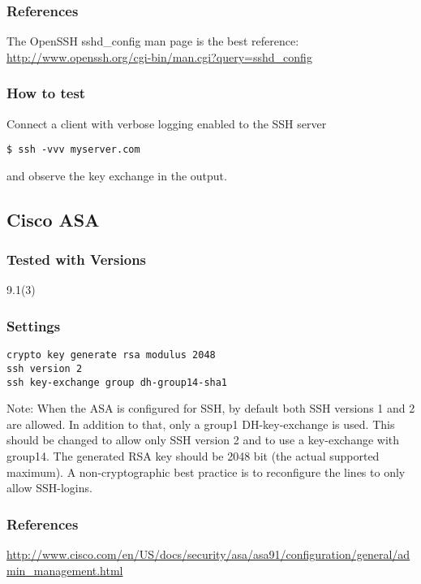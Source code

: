 \subsubsection{References}
The OpenSSH sshd\_config  man page is the best reference: \url{http://www.openssh.org/cgi-bin/man.cgi?query=sshd_config}

\subsubsection{How to test}
Connect a client with verbose logging enabled to the SSH server
\begin{lstlisting}
$ ssh -vvv myserver.com
\end{lstlisting}and observe the key exchange in the output.


\subsection{Cisco ASA}
\subsubsection{Tested with Versions}
\begin{itemize*}
  \item 9.1(3)
\end{itemize*}


\subsubsection{Settings}
\begin{lstlisting}
crypto key generate rsa modulus 2048
ssh version 2
ssh key-exchange group dh-group14-sha1
\end{lstlisting}
Note: When the ASA is configured for SSH, by default both SSH versions 1 and 2 are allowed. In addition to that, only a group1 DH-key-exchange is used. This should be changed to allow only SSH version 2 and to use a key-exchange with group14. The generated RSA key should be 2048 bit (the actual supported maximum). A non-cryptographic best practice is to reconfigure the lines to only allow SSH-logins.

\subsubsection{References}
\begin{itemize*}
  \item \url{http://www.cisco.com/en/US/docs/security/asa/asa91/configuration/general/admin\_management.html }
\end{itemize*}


